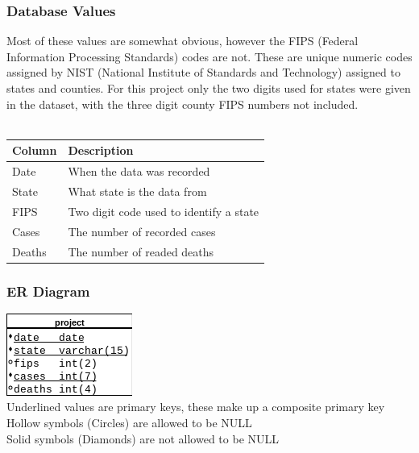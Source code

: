 \documentclass{article}
\begin{document}
\subsubsection{Database Values}
\noindent
Most of these values are somewhat obvious, however the FIPS (Federal Information Processing Standards) codes are not. 
These are unique numeric codes assigned by NIST (National Institute of Standards and Technology) assigned to states 
and counties. For this project only the two digits used for states were given in the dataset, with 
the three digit county FIPS numbers not included. \\ \\
\begin{tabular}{|l|l|}
	\hline
	Column & Description \\
	\hline
	Date & When the data was recorded \\
	\hline
	State & What state is the data from\\
	\hline
	FIPS & Two digit code used to identify a state \\
	\hline
	Cases & The number of recorded cases \\
	\hline
	Deaths & The number of readed deaths \\
	\hline
\end{tabular}

\subsubsection{ER Diagram}
\noindent
\includegraphics[scale=.95]{erdiagram.png} \\
Underlined values are primary keys, these make up a composite primary key \\
Hollow symbols (Circles) are allowed to be NULL \\
Solid symbols (Diamonds) are not allowed to be NULL
\end{document}
